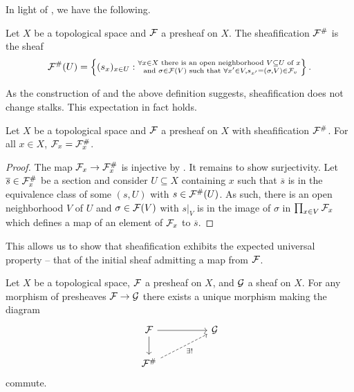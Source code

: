 In light of , we have the following. 
\begin{definition}[Sheafification]\label{def: sheafification}
    Let $X$ be a topological space and $\mathcal{F}$ a presheaf on $X$. The sheafification $\mathcal{F}^{\#}$ is the sheaf 
    $$\mathcal{F}^{\#}(U)=\left\{(s_{x})_{x\in U}:\substack{\forall x\in X \text{ there is an open neighborhood }V\subseteq U\text{ of }x \\ \text{ and }\sigma\in\mathcal{F}(V)\text{ such that }\forall x'\in V, s_{x'}=(\sigma,V)\in\mathcal{F}_{v}}\right\}.$$
\end{definition}
As the construction of  and the above definition suggests, sheafification does not change stalks. This expectation in fact holds. 
\begin{proposition}\label{prop: sheafification does not change stalks}
    Let $X$ be a topological space and $\mathcal{F}$ a presheaf on $X$ with sheafification $\mathcal{F}^{\#}$. For all $x\in X$, $\mathcal{F}_{x}=\mathcal{F}^{\#}_{x}$.
\end{proposition}
\begin{proof}
    The map $\mathcal{F}_{x}\to\mathcal{F}_{x}^{\#}$ is injective by . It remains to show surjectivity. Let $\overline{s}\in\mathcal{F}_{x}^{\#}$ be a section and consider $U\subseteq X$ containing $x$ such that $\overline{s}$ is in the equivalence class of some $(s,U)$ with $s\in\mathcal{F}^{\#}(U)$. As such, there is an open neighborhood $V$ of $U$ and $\sigma\in\mathcal{F}(V)$ with $s|_{V}$ is in the image of $\sigma$ in $\prod_{x\in V}\mathcal{F}_{x}$ which defines a map of an element of $\mathcal{F}_{x}$ to $\overline{s}$. 
\end{proof}
This allows us to show that sheafification exhibits the expected universal property -- that of the initial sheaf admitting a map from $\mathcal{F}$. 
\begin{proposition}\label{prop: universal property of sheafification}
    Let $X$ be a topological space, $\mathcal{F}$ a presheaf on $X$, and $\mathcal{G}$ a sheaf on $X$. For any morphism of presheaves $\mathcal{F}\to\mathcal{G}$ there exists a unique morphism making the diagram 
    $$%
    \begin{tikzcd}
        \Fcal && \Gcal \\
        {\Fcal^{\#}}
        \arrow[from=1-1, to=1-3]
        \arrow[from=1-1, to=2-1]
        \arrow["{\exists!}"', dashed, from=2-1, to=1-3]
    \end{tikzcd}$$
    commute. 
\end{proposition}
